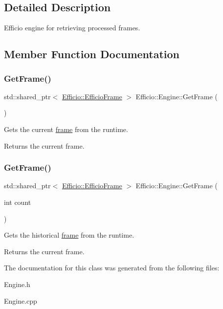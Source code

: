 \subsection{Detailed Description}
Efficio engine for retrieving processed frames. 

\subsection{Member Function Documentation}
\hypertarget{class_efficio_1_1_engine_a4f46a611516d157a32005a860128f9dc}{}\label{class_efficio_1_1_engine_a4f46a611516d157a32005a860128f9dc} 
\subsubsection{\texorpdfstring{Get\+Frame()}{GetFrame()}\hspace{0.1cm}{\footnotesize\ttfamily [1/2]}}
{\footnotesize\ttfamily std\+::shared\+\_\+ptr$<$ \hyperlink{class_efficio_1_1_efficio_frame}{Efficio\+::\+Efficio\+Frame} $>$ Efficio\+::\+Engine\+::\+Get\+Frame (\begin{DoxyParamCaption}{ }\end{DoxyParamCaption})}

Gets the current \hyperlink{class_efficio_1_1_efficio_frame}{frame} from the runtime. \begin{DoxyReturn}{Returns}
the current frame. 
\end{DoxyReturn}
\hypertarget{class_efficio_1_1_engine_a9f81b122b1c2f768110675a79a842117}{}\label{class_efficio_1_1_engine_a9f81b122b1c2f768110675a79a842117} 
\subsubsection{\texorpdfstring{Get\+Frame()}{GetFrame()}\hspace{0.1cm}{\footnotesize\ttfamily [2/2]}}
{\footnotesize\ttfamily std\+::shared\+\_\+ptr$<$ \hyperlink{class_efficio_1_1_efficio_frame}{Efficio\+::\+Efficio\+Frame} $>$ Efficio\+::\+Engine\+::\+Get\+Frame (\begin{DoxyParamCaption}\item[{int}]{count }\end{DoxyParamCaption})}

Gets the historical \hyperlink{class_efficio_1_1_efficio_frame}{frame} from the runtime. \begin{DoxyReturn}{Returns}
the current frame. 
\end{DoxyReturn}


The documentation for this class was generated from the following files\+:\begin{DoxyCompactItemize}
\item 
Engine.\+h\item 
Engine.\+cpp\end{DoxyCompactItemize}
